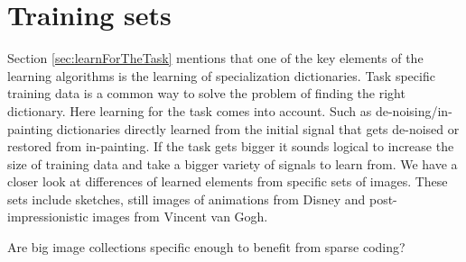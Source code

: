 



\section{Training sets}
Section \ref{sec:learnForTheTask} mentions that one of the key
elements of the learning algorithms is the learning of specialization
dictionaries. Task specific training data is a common way to solve the problem
of finding  the right dictionary. Here learning for the task comes into
account. Such as de-noising/in-painting dictionaries directly learned from the
initial signal that gets de-noised or restored from in-painting. If the task
gets bigger it sounds logical to increase the size of training data and take a
bigger variety of signals to learn from.  We have a closer look at differences
of learned elements from specific sets of images. These sets include sketches,
still images of animations from Disney and post-impressionistic images from
Vincent van Gogh.  

Are big image collections specific enough to benefit from sparse coding?



